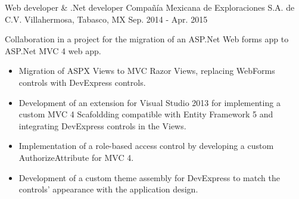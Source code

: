 \begin{cventries}

\cventry
{Web developer \& .Net developer} %
{Compañía Mexicana de Exploraciones S.A. de C.V.} %
{Villahermosa, Tabasco, MX} %
{Sep. 2014 - Apr. 2015} %
{ %
	\begin{cvitems}
		\item {Collaboration in a project for the migration of an ASP.Net Web forms app to ASP.Net MVC 4 web app.}
		\begin{itemize}
			\item {Migration of ASPX Views to MVC Razor Views, replacing WebForms controls with DevExpress controls.}
			\item {Development of an extension for Visual Studio 2013 for implementing a custom MVC 4 Scafoldding compatible with Entity Framework 5 and integrating DevExpress controls in the Views.}
			\item {Implementation of a role-based access control by developing a custom AuthorizeAttribute for MVC 4. }
			\item {Development of a custom theme assembly for DevExpress to match the controls' appearance with the application design.}
		\end{itemize}
	\end{cvitems}
}



\end{cventries}
